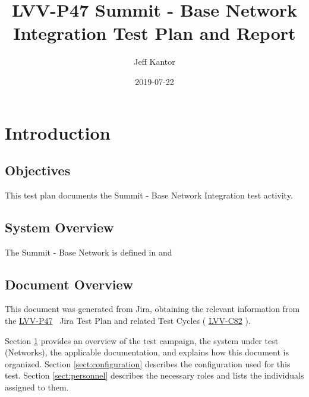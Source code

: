 \documentclass[DM,STR,toc]{lsstdoc}
\begin{document}
\def\milestoneName{Summit - Base Network Integration}
\def\milestoneId{LVV-P47}
\def\product{Networks}


\title{ LVV-P47 Summit - Base Network Integration Test Plan and Report}
\setDocRef{\lsstDocType-\lsstDocNum}
\date{2019-07-22}
\author{ Jeff Kantor }






\maketitle

\section{Introduction}
\label{sect:intro}


\subsection{Objectives}
\label{sect:objectives}

This test plan documents the Summit - Base Network Integration test
activity.



\subsection{System Overview}
\label{sect:systemoverview}

The Summit - Base Network is defined in  and 


\subsection{Document Overview}
\label{sect:docoverview}

This document was generated from Jira, obtaining the relevant information from the 
\href{https://jira.lsstcorp.org/secure/Tests.jspa#/testPlan/LVV-P47}{LVV-P47}
~Jira Test Plan and related Test Cycles (
  \href{https://jira.lsstcorp.org/secure/Tests.jspa#/testCycle/LVV-C82}{LVV-C82}
).

Section \ref{sect:intro} provides an overview of the test campaign, the system under test (\product{}), the applicable documentation, and explains how this document is organized.
Section \ref{sect:configuration}  describes the configuration used for this test.
Section \ref{sect:personnel} describes the necessary roles and lists the individuals assigned to them.
\end{document}
